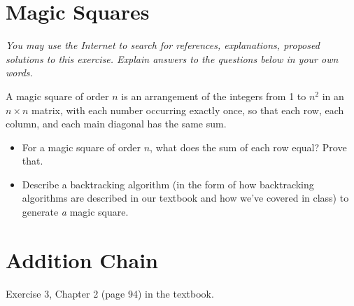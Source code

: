 \documentclass[12pt]{article}
\begin{document}
\section{Magic Squares}

\textit{You may use the Internet to search for references, explanations, proposed solutions to this exercise. Explain answers to the questions below in your own words.}

A magic square  of order $n$ is an arrangement of the integers from 1 to $n^2$ in an $n \times n$ matrix, with each number occurring exactly once, so that each row, each column, and each main diagonal has the same sum.

\begin{itemize}
    \item For a magic square of order $n$, what does the sum of each row equal? Prove that. 
    \item Describe a backtracking algorithm (in the form of how backtracking algorithms are described in our textbook and how we've covered in class) to generate \emph{a} magic square.
\end{itemize}



\section{Addition Chain}

Exercise 3, Chapter 2 (page 94) in the textbook.
\end{document}
